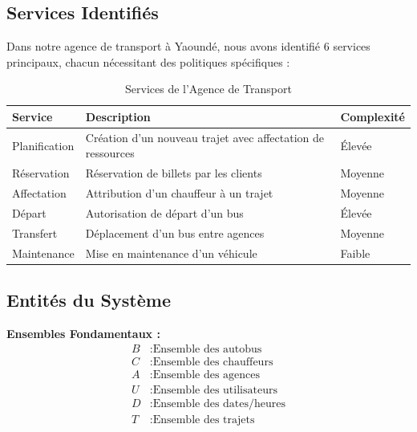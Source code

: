 \documentclass[12pt,a4paper]{article}
\begin{document}
    \subsection{Services Identifiés}

    Dans notre agence de transport à Yaoundé, nous avons identifié 6 services principaux, chacun nécessitant des politiques spécifiques :

    \begin{table}[H]
        \centering
        \begin{tabular}{|l|p{8cm}|l|}
            \hline
            \textbf{Service} & \textbf{Description} & \textbf{Complexité} \\
            \hline
            Planification & Création d'un nouveau trajet avec affectation de ressources & Élevée \\
            Réservation & Réservation de billets par les clients & Moyenne \\
            Affectation & Attribution d'un chauffeur à un trajet & Moyenne \\
            Départ & Autorisation de départ d'un bus & Élevée \\
            Transfert & Déplacement d'un bus entre agences & Moyenne \\
            Maintenance & Mise en maintenance d'un véhicule & Faible \\
            \hline
        \end{tabular}
        \caption{Services de l'Agence de Transport}
    \end{table}

    \subsection{Entités du Système}

    \begin{definitionbox}
        \textbf{Ensembles Fondamentaux :}
        \begin{align}
            B &: \text{Ensemble des autobus} \\
            C &: \text{Ensemble des chauffeurs} \\
            A &: \text{Ensemble des agences} \\
            U &: \text{Ensemble des utilisateurs} \\
            D &: \text{Ensemble des dates/heures} \\
            T &: \text{Ensemble des trajets}
        \end{align}
    \end{definitionbox}
\end{document}
